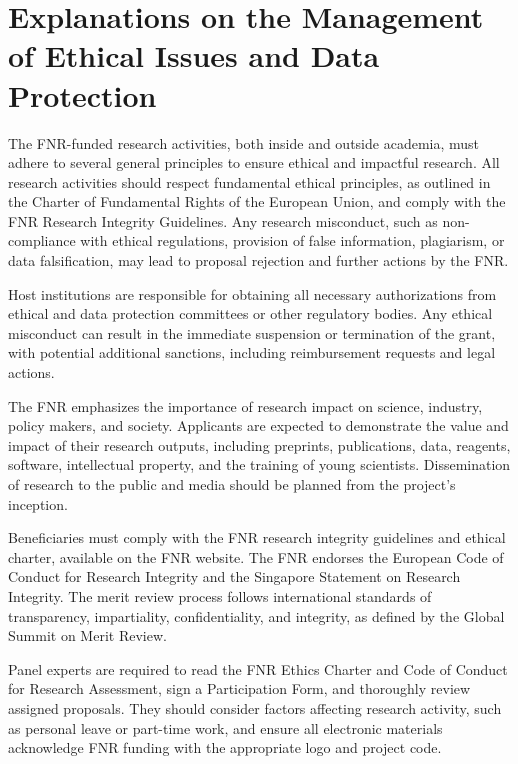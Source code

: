 \documentclass{article}
\begin{document}
\section{Explanations on the Management of Ethical Issues and Data Protection}

The FNR-funded research activities, both inside and outside academia, must adhere to several general principles to ensure ethical and impactful research. All research activities should respect fundamental ethical principles, as outlined in the Charter of Fundamental Rights of the European Union, and comply with the FNR Research Integrity Guidelines. Any research misconduct, such as non-compliance with ethical regulations, provision of false information, plagiarism, or data falsification, may lead to proposal rejection and further actions by the FNR.

Host institutions are responsible for obtaining all necessary authorizations from ethical and data protection committees or other regulatory bodies. Any ethical misconduct can result in the immediate suspension or termination of the grant, with potential additional sanctions, including reimbursement requests and legal actions.

The FNR emphasizes the importance of research impact on science, industry, policy makers, and society. Applicants are expected to demonstrate the value and impact of their research outputs, including preprints, publications, data, reagents, software, intellectual property, and the training of young scientists. Dissemination of research to the public and media should be planned from the project's inception.

Beneficiaries must comply with the FNR research integrity guidelines and ethical charter, available on the FNR website. The FNR endorses the European Code of Conduct for Research Integrity and the Singapore Statement on Research Integrity. The merit review process follows international standards of transparency, impartiality, confidentiality, and integrity, as defined by the Global Summit on Merit Review.

Panel experts are required to read the FNR Ethics Charter and Code of Conduct for Research Assessment, sign a Participation Form, and thoroughly review assigned proposals. They should consider factors affecting research activity, such as personal leave or part-time work, and ensure all electronic materials acknowledge FNR funding with the appropriate logo and project code.
\end{document}
